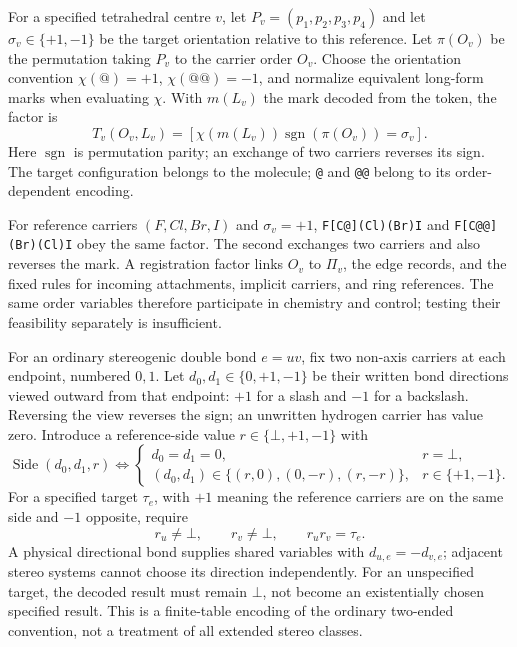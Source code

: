 \documentclass[11pt,a4paper]{article}
\newcommand{\sgn}{\operatorname{sgn}}
\newcommand{\ind}[1]{\left[#1\right]}
\newcommand{\ttt}[1]{\texttt{#1}}
\newcommand{\none}{\bot}
\begin{document}
For a specified tetrahedral centre \(v\), let \(P_v=(p_1,p_2,p_3,p_4)\) and let
\(\sigma_v\in\{+1,-1\}\) be the target orientation relative to this reference.
Let \(\pi(O_v)\) be the permutation taking \(P_v\) to the carrier order \(O_v\).
Choose the orientation convention \(\chi(\ttt{@})=+1\),
\(\chi(\ttt{@@})=-1\), and normalize equivalent long-form marks when evaluating
\(\chi\). With \(m(L_v)\) the mark decoded from the token, the factor is
\begin{equation}\label{eq:tetra}
 T_v(O_v,L_v)=
 \ind{\chi(m(L_v))\sgn(\pi(O_v))=\sigma_v}.
\end{equation}
Here \(\sgn\) is permutation parity; an exchange of two carriers reverses its
sign. The target configuration belongs to the molecule; \ttt{@} and \ttt{@@}
belong to its order-dependent encoding.\cite{opensmiles}

For reference carriers \((F,Cl,Br,I)\) and \(\sigma_v=+1\),
\ttt{F[C@](Cl)(Br)I} and \ttt{F[C@@](Br)(Cl)I} obey the same factor.
The second exchanges two carriers and also reverses the mark. A registration
factor links \(O_v\) to \(\Pi_v\), the edge records, and the fixed rules for
incoming attachments, implicit carriers, and ring references. The same order
variables therefore participate in chemistry and control; testing their
feasibility separately is insufficient.

For an ordinary stereogenic double bond \(e=uv\), fix two non-axis carriers at
each endpoint, numbered \(0,1\). Let \(d_0,d_1\in\{0,+1,-1\}\) be their written
bond directions viewed outward from that endpoint: \(+1\) for a slash and
\(-1\) for a backslash. Reversing the view reverses the sign; an unwritten
hydrogen carrier has value zero. Introduce a reference-side value \(r\in\{\none,+1,-1\}\) with
\[
 \operatorname{Side}(d_0,d_1,r)\iff
 \begin{cases}
   d_0=d_1=0, &r=\none,\\
   (d_0,d_1)\in\{(r,0),(0,-r),(r,-r)\}, &r\in\{+1,-1\}.
 \end{cases}
\]
For a specified target \(\tau_e\), with \(+1\) meaning the reference carriers are
on the same side and \(-1\) opposite, require
\[
 r_u\ne\none,\qquad r_v\ne\none,\qquad r_ur_v=\tau_e.
\]
A physical directional bond supplies shared variables with
\(d_{u,e}=-d_{v,e}\); adjacent stereo systems cannot choose its direction
independently. For an unspecified target, the decoded result must remain
\(\none\), not become an existentially chosen specified result. This is a
finite-table encoding of the ordinary two-ended convention, not a treatment of
all extended stereo classes.
\end{document}
